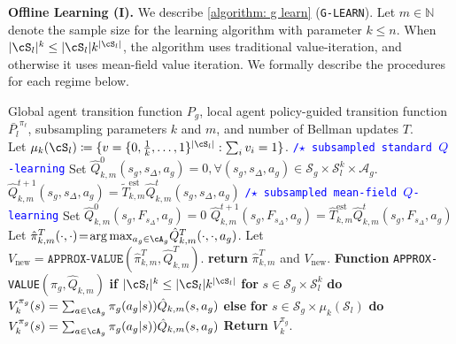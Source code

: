 \textbf{Offline Learning (I).} We describe \cref{algorithm: g learn} (\texttt{G-LEARN}). Let $m\in\mathbb N$ denote the sample size for the learning algorithm with parameter $k\leq n$. When $|\cS_l|^k \leq |\cS_l|k^{|\cS_l|}$, the algorithm uses traditional value-iteration, and otherwise it uses mean-field value iteration. We formally describe the procedures for each regime below.
\begin{algorithm}[t]
    \caption{\texttt{G-LEARN:} Global-agent $Q$-learning}
    \begin{algorithmic}
        \REQUIRE Global agent transition function $P_g$, local agent policy-guided transition function $\bar{P_l}^{\pi_\ell}$, subsampling parameters $k$ and $m$, and number of Bellman updates $T$.\\
        \STATE Let $\mu_{k}(\cS_l) \coloneqq \{v=\{0, \frac1k, \dots, 1\}^{|\cS_l|}: \sum_i v_i = 1\}$.
        \STATE \textcolor{blue}{\texttt{/$\star$ subsampled standard $Q$-learning}}
        \STATE Set $\hat{Q}_{k,m}^0(s_g, s_\Delta,a_g)\!=\!0, \forall (s_g, s_\Delta, a_g)\!\in\! \mathcal{S}_g\!\times\! \mathcal{S}_l^k\!\times\!  \mathcal{A}_g$.
        \STATE $\hat{Q}_{k,m}^{t+1}(s_g,s_\Delta,a_g) = \tilde{T}_{k,m}^{\text{est}}\hat{Q}_{k,m}^t(s_g,s_\Delta,a_g)$
        \ENDFOR
        \ENDFOR
        \ELSE
        \STATE \textcolor{blue}{\texttt{/$\star$ subsampled mean-field $Q$-learning}}
        \STATE \!\!Set $\hat{Q}_{k,m}^0(s_g,F_{ s_\Delta},a_g)=0$
        \STATE $\hat{Q}_{k,m}^{t+1}(s_g, F_{s_\Delta},a_g) = \hat{T}_{k,m}^{\text{est}}\hat{Q}_{k,m}^t(s_g, F_{s_\Delta},a_g)$
        \ENDFOR
        \ENDFOR
        \ENDIF 
        \STATE Let
 $\hat{\pi}_{k,m}^{T}(\cdot,\cdot)\!=\!\arg\max_{a_g\in\cA_g}\! \hat{Q}_{k,m}^{T}(\cdot,\cdot,a_g)$.
 \STATE Let $V_{\text{new}} = \texttt{APPROX-VALUE}(\hat{\pi}_{k,m}^{T}, \hat{Q}_{k,m}^{T})$.
     \STATE \textbf{return} $\hat{\pi}_{k,m}^{T}$ and $V_{\text{new}}$.
\smallskip
\STATE \textbf{Function} \texttt{APPROX-VALUE}$(\pi_g, \hat{Q}_{k,m})$
\STATE \textbf{if} { $|\cS_l|^k \leq |\cS_l| k^{|\cS_l|}$} 
        \STATE \quad \textbf{for} $s \in \mathcal{S}_g\times \mathcal{S}_l^k$ \textbf{do}
         \STATE \quad\quad  $V_k^{\pi_g}(s) = \sum_{a\in \cA_g} \pi_g(a_g|s))\hat{Q}_{k,m}(s, a_g)$
    \STATE \textbf{else}
   \STATE \quad \textbf{for} $s\in \mathcal{S}_g\times\mu_k(\mathcal{S}_l)$ \textbf{do}
   \STATE \quad\quad $V_k^{\pi_g}(s) = \sum_{a\in \cA_g} \pi_g(a_g|s))\hat{Q}_{k,m}(s, a_g)$
\STATE \textbf{Return $V_k^{\pi_g}$}.
         \label{algorithm: g learn}
    \end{algorithmic}
\end{algorithm}
